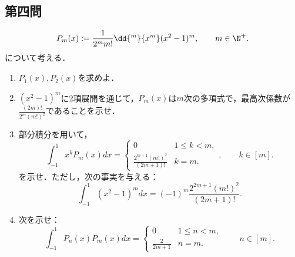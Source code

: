 \documentclass[uplatex,dvipdfmx]{jsarticle}
\begin{document}
\subsection{第四問}

\begin{tcolorbox}[colframe=ForestGreen, colback=ForestGreen!10!white,breakable,colbacktitle=ForestGreen!40!white,coltitle=black,fonttitle=\bfseries\sffamily,
    title=第４問]
    \begin{problem}
        \[P_m(x):=\frac{1}{2^mm!}\dd{^m}{x^m}(x^2-1)^m,\qquad m\in\N^+.\]
        について考える．
        \begin{enumerate}[{問}1]
            \item $P_1(x),P_2(x)$を求めよ．
            \item $(x^2-1)^m$に2項展開を通じて，$P_m(x)$は$m$次の多項式で，最高次係数が$\frac{(2m)!}{2^m(m!)^2}$であることを示せ．
            \item 部分積分を用いて，
            \[\int^1_{-1}x^kP_m(x)dx=\begin{cases}
                0&1\le k<m,\\
                \frac{2^{m+1}(m!)^2}{(2m+1)!}&k=m.
            \end{cases},\qquad k\in[m].\]
            を示せ．ただし，次の事実を与える：
            \[\int^1_{-1}(x^2-1)^mdx=(-1)^m\frac{2^{2m+1}(m!)^2}{(2m+1)!}.\]
            \item 次を示せ：
            \[\int^1_{-1}P_n(x)P_m(x)dx=\begin{cases}
                0&1\le n<m,\\
                \frac{2}{2m+1}&n=m.
            \end{cases}\qquad n\in[m].\]
        \end{enumerate}
    \end{problem}
\end{tcolorbox}
\end{document}
